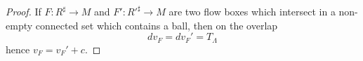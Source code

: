 \documentclass{ip-journal}
\theoremstyle{definition}
\numberwithin{equation}{section}
\begin{document}
\begin{proof}
%  
 If $F: R^\sharp \rightarrow M$ and $F': {R'}^\sharp \rightarrow M$ are two flow boxes  which intersect in a non-empty connected set which contains a ball, then on the overlap
 \begin{equation}\label{globaltheory}
 dv_F = dv_F'=T_\Lambda
 \end{equation}
 hence 
$v_F = v_F' + c.$



\end{proof}
\end{document}
